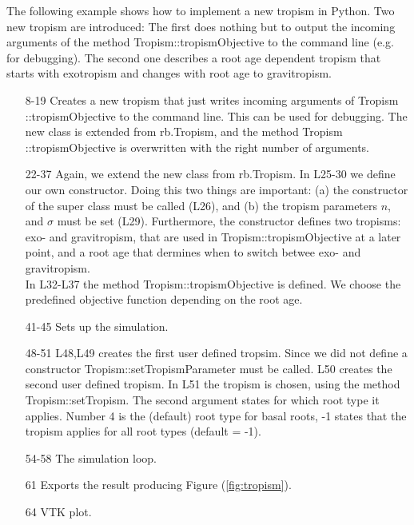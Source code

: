 The following example shows how to implement a new tropism in Python. Two new tropism are introduced:
The first does nothing but to output the incoming arguments of the method Tropism::tropismObjective to the command line (e.g. for debugging). The second one describes a root age dependent tropism that starts with exotropism and changes with root age to gravitropism.



\begin{itemize}

\item[8-19] Creates a new tropism that just writes incoming arguments of Tropism ::tropismObjective to the command line. This can be used for debugging. The new class is extended from rb.Tropism, and the method Tropism ::tropismObjective is overwritten with the right number of arguments.

\item[22-37] Again, we extend the new class from rb.Tropism. In L25-30 we define our own constructor. Doing this two things are important: (a) the constructor of the super class must be called (L26), and (b) the tropism parameters $n$, and $\sigma$ must be set (L29). 
Furthermore, the constructor defines two tropisms: exo- and gravitropism, that are used in Tropism::tropismObjective at a later point, and a root age that dermines when to switch betwee exo- and gravitropism. \\
In L32-L37 the method Tropism::tropismObjective is defined. We choose the predefined objective function depending on the root age.

\item[41-45] Sets up the simulation.

\item[48-51] L48,L49 creates the first user defined tropsim. Since we did not define a constructor Tropism::setTropismParameter must be called. L50 creates the second user defined tropism.  In L51 the tropism is chosen, using the method Tropism::setTropism. The second argument states for which root type it applies. 
Number 4 is the (default) root type for basal roots, -1 states that the tropism applies for all root types (default = -1).

\item[54-58] The simulation loop. 

\item [61] Exports the result producing Figure (\ref{fig:tropism}). 

\item [64] VTK plot.

\end{itemize}

